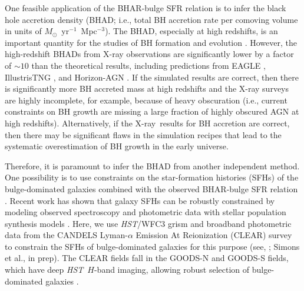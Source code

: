 \documentclass[twocolumn,twocolappendix,times]{aastex63}
\newcommand{\hst}{{\it HST\/}}       %
\newcommand{\xray}{\hbox{X-ray}}  %
\newcommand{\fst}[1]{#1}
\begin{document}
\begin{CJK*}{UTF8}{gbsn}
One feasible application of the BHAR-bulge SFR relation is to infer the black hole accretion density (BHAD; i.e., total BH accretion rate per comoving volume in units of $M_\odot$~yr$^{-1}$~Mpc$^{-3}$).
The BHAD, especially at high redshifts, is an important quantity for the studies of BH formation and evolution \citep[e.g.,][]{bonoli14, volonteri16}.  
However, the high-redshift BHADs from X-ray observations \citep[e.g.,][]{vito16, vito18} are significantly lower \fst{by a factor of $\sim 10$} than the theoretical results, including predictions from EAGLE \citep{crain15}, IllustrisTNG \citep{weinberger17}, and Horizon-AGN \citep{volonteri16}. 
If the simulated results are correct, then there is significantly more BH accreted mass at high redshifts and the X-ray surveys are highly incomplete, for example, because of heavy obscuration (i.e., current constraints on BH growth are missing a large fraction of highly obscured AGN at high redshifts). 
Alternatively, if the \xray\ results for BH accretion are correct, then there may be significant flaws in the simulation recipes that lead to the systematic overestimation of BH growth in the early universe. 

Therefore, it is paramount to infer the BHAD from another independent method. 
One possibility is to use constraints on the star-formation histories (SFHs) of the bulge-dominated galaxies combined with the observed BHAR-bulge SFR relation \citep{yang19}.
Recent work has shown that galaxy SFHs can be robustly constrained by modeling observed spectroscopy and photometric data with stellar population synthesis models  \citep[e.g.,][]{schreiber18, akhshik20, estrada_carpenter20}.
Here, we use \hst/WFC3 grism and broadband photometric data from the CANDELS Lyman-$\alpha$ Emission At Reionization (CLEAR) survey to constrain the SFHs of bulge-dominated galaxies for this purpose (see, \citealt{estrada_carpenter19, estrada_carpenter20}; Simons et al., in prep). 
The CLEAR fields fall in the GOODS-N and GOODS-S fields, which have deep \hst\ $H$-band imaging, 
allowing robust selection of bulge-dominated galaxies \citep{huertas_company15, huertas_company15b, yang19}.


\end{CJK*}
\end{document}
